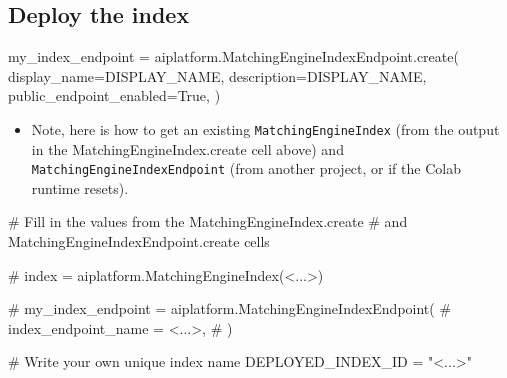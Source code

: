 \documentclass[
  letterpaper,
  DIV=11,
  numbers=noendperiod]{scrreprt}
\newenvironment{Shaded}{\begin{snugshade}}{\end{snugshade}}
\newcommand{\CommentTok}[1]{\textcolor[rgb]{0.37,0.37,0.37}{#1}}
\newcommand{\NormalTok}[1]{\textcolor[rgb]{0.00,0.23,0.31}{#1}}
\newcommand{\OperatorTok}[1]{\textcolor[rgb]{0.37,0.37,0.37}{#1}}
\newcommand{\StringTok}[1]{\textcolor[rgb]{0.13,0.47,0.30}{#1}}
\newcommand{\VariableTok}[1]{\textcolor[rgb]{0.07,0.07,0.07}{#1}}
\providecommand{\tightlist}{%
  \setlength{\itemsep}{0pt}\setlength{\parskip}{0pt}}\usepackage{longtable,booktabs,array}
\begin{document}
\hypertarget{deploy-the-index}{%
\subsection{Deploy the index}\label{deploy-the-index}}

\begin{Shaded}
\begin{Highlighting}[]
\NormalTok{my\_index\_endpoint }\OperatorTok{=}\NormalTok{ aiplatform.MatchingEngineIndexEndpoint.create(}
\NormalTok{    display\_name}\OperatorTok{=}\NormalTok{DISPLAY\_NAME,}
\NormalTok{    description}\OperatorTok{=}\NormalTok{DISPLAY\_NAME,}
\NormalTok{    public\_endpoint\_enabled}\OperatorTok{=}\VariableTok{True}\NormalTok{,}
\NormalTok{)}
\end{Highlighting}
\end{Shaded}

\begin{itemize}
\tightlist
\item
  Note, here is how to get an existing \texttt{MatchingEngineIndex}
  (from the output in the MatchingEngineIndex.create cell above) and
  \texttt{MatchingEngineIndexEndpoint} (from another project, or if the
  Colab runtime resets).
\end{itemize}

\begin{Shaded}
\begin{Highlighting}[]
\CommentTok{\# Fill in the values from the MatchingEngineIndex.create}
\CommentTok{\# and MatchingEngineIndexEndpoint.create cells}

\CommentTok{\# index = aiplatform.MatchingEngineIndex(\textquotesingle{}\textless{}...\textgreater{}\textquotesingle{})}

\CommentTok{\# my\_index\_endpoint = aiplatform.MatchingEngineIndexEndpoint(}
\CommentTok{\#     index\_endpoint\_name = \textquotesingle{}\textless{}...\textgreater{}\textquotesingle{},}
\CommentTok{\# )}

\end{Highlighting}
\end{Shaded}

\begin{Shaded}
\begin{Highlighting}[]
\CommentTok{\# Write your own unique index name}
\NormalTok{DEPLOYED\_INDEX\_ID }\OperatorTok{=} \StringTok{"\textless{}...\textgreater{}"}
\end{Highlighting}
\end{Shaded}
\end{document}
